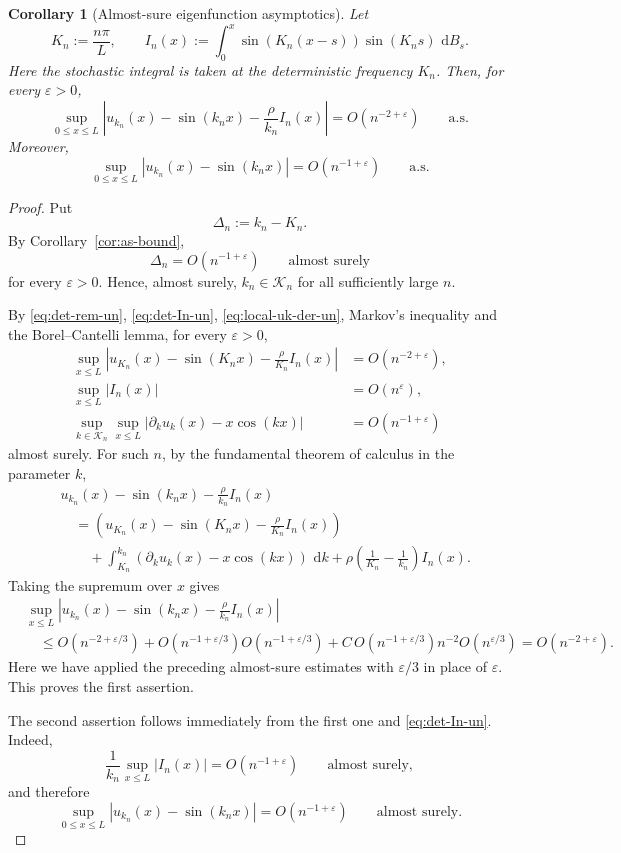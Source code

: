 \documentclass[11pt]{article}
\newtheorem{corollary}[theorem]{Corollary}
\newcommand{\dd}{\,\mathrm d}
\begin{document}
\begin{corollary}[Almost-sure eigenfunction asymptotics]
\label{cor:as-eigenfunction}
Let
\[
    K_n:=\frac{n\pi}{L},
    \qquad
    I_n(x):=\int_0^x\sin\left(K_n(x-s)\right)\sin(K_ns)\,\dd B_s.
\]
Here the stochastic integral is taken at the deterministic frequency $K_n$.
Then, for every $\varepsilon>0$,
\[
    \sup_{0\le x\le L}\left|u_{k_n}(x)-\sin(k_nx)-\frac{\rho}{k_n}I_n(x)\right|
    =
    O(n^{-2+\varepsilon})
    \qquad\text{a.s.}
\]
Moreover,
\[
    \sup_{0\le x\le L}|u_{k_n}(x)-\sin(k_nx)|
    =
    O(n^{-1+\varepsilon})
    \qquad\text{a.s.}
\]
\end{corollary}


\begin{proof}
Put
\[
    \Delta_n:=k_n-K_n.
\]
By Corollary~\ref{cor:as-bound},
\[
    \Delta_n=O(n^{-1+\varepsilon})
    \qquad\text{almost surely}
\]
for every $\varepsilon>0$. Hence, almost surely, $k_n\in\mathcal K_n$ for all sufficiently large $n$.

By \eqref{eq:det-rem-un}, \eqref{eq:det-In-un}, \eqref{eq:local-uk-der-un}, Markov's inequality and the Borel--Cantelli lemma, for every $\varepsilon>0$,
\begin{align*}
    \sup_{x\le L}\left|u_{K_n}(x)-\sin(K_nx)-\frac{\rho}{K_n}I_n(x)\right|
    &=O(n^{-2+\varepsilon}), \\
    \sup_{x\le L}|I_n(x)|
    &=O(n^{\varepsilon}), \\
    \sup_{k\in\mathcal K_n}\sup_{x\le L}|\partial_k u_k(x)-x\cos(kx)|
    &=O(n^{-1+\varepsilon})
\end{align*}
almost surely.
For such $n$, by the fundamental theorem of calculus in the parameter $k$,
\[
\begin{aligned}
&u_{k_n}(x)-\sin(k_nx)-\frac{\rho}{k_n}I_n(x) \\
&\quad=
\left(u_{K_n}(x)-\sin(K_nx)-\frac{\rho}{K_n}I_n(x)\right) \\
&\qquad+
\int_{K_n}^{k_n}\left(\partial_k u_k(x)-x\cos(kx)\right)\,\dd k
+\rho\left(\frac1{K_n}-\frac1{k_n}\right)I_n(x).
\end{aligned}
\]
Taking the supremum over $x$ gives
\[
\begin{aligned}
&\sup_{x\le L}\left|u_{k_n}(x)-\sin(k_nx)-\frac{\rho}{k_n}I_n(x)\right| \\
&\quad\le O(n^{-2+\varepsilon/3})
+O(n^{-1+\varepsilon/3})O(n^{-1+\varepsilon/3})
+C\,O(n^{-1+\varepsilon/3})n^{-2}O(n^{\varepsilon/3})
=O(n^{-2+\varepsilon}).
\end{aligned}
\]
Here we have applied the preceding almost-sure estimates with $\varepsilon/3$ in place of $\varepsilon$. This proves the first assertion.

The second assertion follows immediately from the first one and \eqref{eq:det-In-un}. Indeed,
\[
    \frac1{k_n}\sup_{x\le L}|I_n(x)|=O(n^{-1+\varepsilon})
    \qquad\text{almost surely},
\]
and therefore
\[
    \sup_{0\le x\le L}|u_{k_n}(x)-\sin(k_nx)|
    =O(n^{-1+\varepsilon})
    \qquad\text{almost surely}.
\]
\end{proof}
\end{document}
